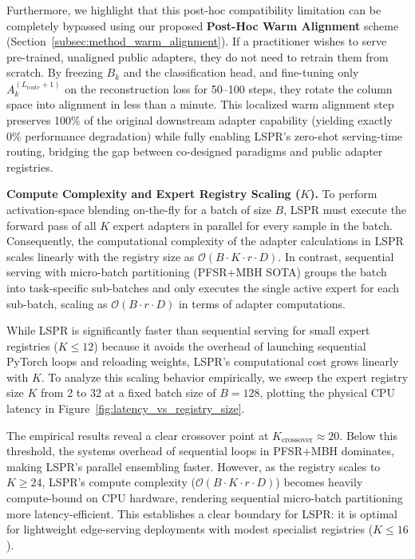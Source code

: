 Furthermore, we highlight that this post-hoc compatibility limitation can be completely bypassed using our proposed \textbf{Post-Hoc Warm Alignment} scheme (Section~\ref{subsec:method_warm_alignment}). If a practitioner wishes to serve pre-trained, unaligned public adapters, they do not need to retrain them from scratch. By freezing $B_k$ and the classification head, and fine-tuning only $A_k^{(L_{\text{route}}+1)}$ on the reconstruction loss for 50--100 steps, they rotate the column space into alignment in less than a minute. This localized warm alignment step preserves 100\% of the original downstream adapter capability (yielding exactly 0\% performance degradation) while fully enabling LSPR's zero-shot serving-time routing, bridging the gap between co-designed paradigms and public adapter registries.

\textbf{Compute Complexity and Expert Registry Scaling ($K$).}
To perform activation-space blending on-the-fly for a batch of size $B$, LSPR must execute the forward pass of all $K$ expert adapters in parallel for every sample in the batch. Consequently, the computational complexity of the adapter calculations in LSPR scales linearly with the registry size as $\mathcal{O}(B \cdot K \cdot r \cdot D)$. In contrast, sequential serving with micro-batch partitioning (PFSR+MBH SOTA) groups the batch into task-specific sub-batches and only executes the single active expert for each sub-batch, scaling as $\mathcal{O}(B \cdot r \cdot D)$ in terms of adapter computations.

While LSPR is significantly faster than sequential serving for small expert registries ($K \le 12$) because it avoids the overhead of launching sequential PyTorch loops and reloading weights, LSPR's computational cost grows linearly with $K$. To analyze this scaling behavior empirically, we sweep the expert registry size $K$ from 2 to 32 at a fixed batch size of $B=128$, plotting the physical CPU latency in Figure~\ref{fig:latency_vs_registry_size}.

The empirical results reveal a clear crossover point at $K_{\text{crossover}} \approx 20$. Below this threshold, the systems overhead of sequential loops in PFSR+MBH dominates, making LSPR's parallel ensembling faster. However, as the registry scales to $K \ge 24$, LSPR's compute complexity ($\mathcal{O}(B \cdot K \cdot r \cdot D)$) becomes heavily compute-bound on CPU hardware, rendering sequential micro-batch partitioning more latency-efficient. This establishes a clear boundary for LSPR: it is optimal for lightweight edge-serving deployments with modest specialist registries ($K \le 16$).


